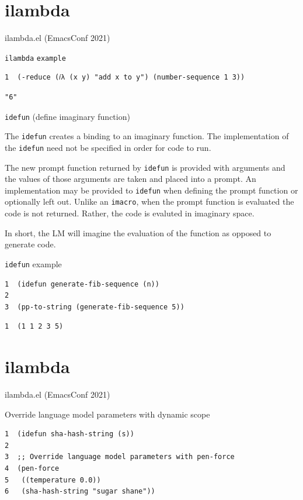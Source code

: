 \documentclass[presentation]{beamer}
\begin{document}
\section{ilambda}
\label{sec:org837410f}
\begin{frame}[label={sec:orge18abaa},fragile]{ilambda.el (EmacsConf 2021)}
 \begin{block}{\texttt{ilambda} \texttt{example}}
{\tiny
\begin{verbatim}
1  (-reduce (𝑖λ (x y) "add x to y") (number-sequence 1 3))
\end{verbatim}
}

{\tiny
\begin{verbatim}
"6"
\end{verbatim}
}
\end{block}

\begin{block}{\texttt{idefun} (define imaginary function)}
{\tiny
The \texttt{idefun} creates a binding to an imaginary
function. The implementation of the \texttt{idefun}
need not be specified in order for code to
run.

The new prompt function returned by \texttt{idefun} is provided with arguments and the
values of those arguments are taken and placed
into a prompt. An implementation may be
provided to \texttt{idefun} when defining the prompt function or optionally left out.
Unlike an \texttt{imacro}, when the prompt function
is evaluated the code is not returned. Rather,
the code is evaluted in imaginary space.

In short, the LM will imagine the evaluation
of the function as opposed to generate code.
}
\end{block}

\begin{block}{\texttt{idefun} example}
{\tiny
\begin{verbatim}
1  (idefun generate-fib-sequence (n))
2  
3  (pp-to-string (generate-fib-sequence 5))
\end{verbatim}
}

{\tiny
\begin{verbatim}
1  (1 1 2 3 5)
\end{verbatim}
}
\end{block}
\end{frame}

\section{ilambda}
\label{sec:orgc1adb1c}
\begin{frame}[label={sec:org9600b34},fragile]{ilambda.el (EmacsConf 2021)}
 \begin{block}{Override language model parameters with dynamic scope}
\begin{verbatim}
1  (idefun sha-hash-string (s))
2  
3  ;; Override language model parameters with pen-force
4  (pen-force
5   ((temperature 0.0))
6   (sha-hash-string "sugar shane"))
\end{verbatim}
\end{block}
\end{frame}
\end{document}

